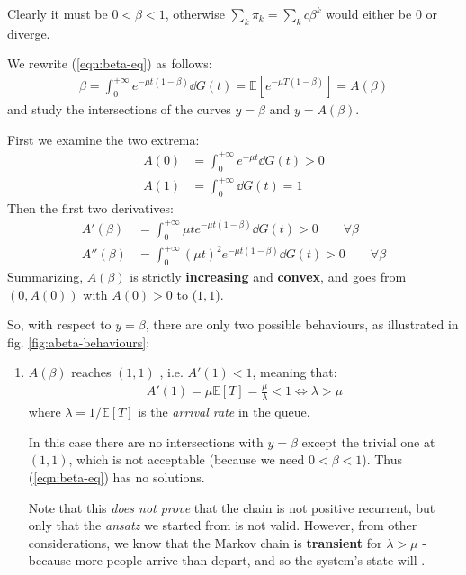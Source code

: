 \documentclass[../template.tex]{subfiles}
\begin{document}
\begin{example}
    Clearly it must be $0 < \beta < 1$, otherwise $\sum_k \pi_k = \sum_k c \beta^k$ would either be $0$ or diverge. 

    We rewrite (\ref{eqn:beta-eq}) as follows:
    \begin{align*}
        \beta = \int_0^{+\infty} e^{- \mu t(1-\beta)} \dd{G(t)} = \mathbb{E}[e^{-\mu T (1-\beta)}] = A(\beta)
    \end{align*}
    and study the intersections of the curves $y = \beta$ and $y= A(\beta)$.

    \medskip

    First we examine the two extrema:
    \begin{align*}
        A(0) &= \int_0^{+\infty} e^{-\mu t} \dd{G(t)} > 0\\
        A(1) &= \int_0^{+\infty} \dd{G(t)} = 1
    \end{align*}
    Then the first two derivatives:
    \begin{align*}
        A'(\beta) &= \int_0^{+\infty} \mu t e^{-\mu t(1-\beta)} \dd{G(t)} > 0 \qquad \forall \beta\\
        A''(\beta) &= \int_0^{+\infty} (\mu t)^2 e^{-\mu t (1-\beta)} \dd{G(t)} > 0 \qquad \forall \beta
    \end{align*}
    Summarizing, $A(\beta)$ is strictly \textbf{increasing} and \textbf{convex}, and goes from $(0, A(0))$ with $A(0) > 0$ to ($1,1$). 

    \medskip

    So, with respect to $y = \beta$, there are only two possible behaviours, as illustrated in fig. \ref{fig:abeta-behaviours}:
    \begin{enumerate}
        \item $A(\beta)$ reaches $(1,1)$ , i.e. $A'(1) < 1$, meaning that:
        \begin{align*}
            A'(1) = \mu \mathbb{E}[T] = \frac{\mu}{\lambda} < 1 \Leftrightarrow \lambda > \mu
        \end{align*}
        where $\lambda = 1/\mathbb{E}[T]$ is the \textit{arrival rate} in the queue. 

        In this case there are no intersections with $y = \beta$ except the trivial one at $(1,1)$, which is not acceptable (because we need $0<\beta < 1$). Thus (\ref{eqn:beta-eq}) has no solutions. 

        Note that this \textit{does not prove} that the chain is not positive recurrent, but only that the \textit{ansatz} we started from is not valid. However, from other considerations, we know that the Markov chain is \textbf{transient} for $\lambda > \mu$ - because more people arrive than depart, and so the system's state will .   


\end{enumerate}
\end{example}
\end{document}
